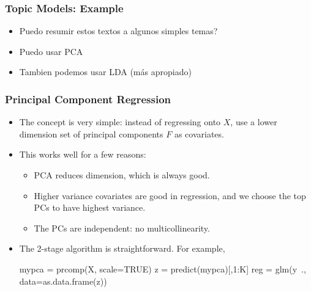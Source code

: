 \documentclass[
  shownotes,
  xcolor={svgnames},
  hyperref={colorlinks,citecolor=DarkBlue,linkcolor=DarkRed,urlcolor=DarkBlue}
  , aspectratio=169]{beamer}
\newcommand{\nv}{\color{Navy}}
\begin{document}
\begin{frame}[fragile]
\frametitle{Topic Models: Example}
\begin{itemize}


\item Puedo resumir estos textos a algunos simples temas?
\medskip
\item Puedo usar PCA
\medskip
\item Tambien podemos usar LDA (más apropiado)
\end{itemize}

\end{frame}
\begin{frame}[fragile]
\frametitle{Principal Component Regression}


\begin{itemize}




\item The concept is very simple: instead of regressing onto $X$, use a lower dimension set of principal components $F$ as covariates.

\medskip
\item This works well for a few reasons:
\begin{itemize}
\item PCA reduces dimension, which is always good.
\item Higher variance covariates are good in regression, and we choose
  the top PCs to have highest variance.
\item The PCs are independent: no multicollinearity.
\end{itemize}


\item The 2-stage algorithm is straightforward. For example,

{\nv 
\begin{semiverbatim}\vspace{.25cm}\small
         mypca = prcomp(X, scale=TRUE)
         z = predict(mypca)[,1:K]
         reg = glm(y~., data=as.data.frame(z))
\end{semiverbatim}
}

\end{itemize}


\end{frame}

\end{document}
